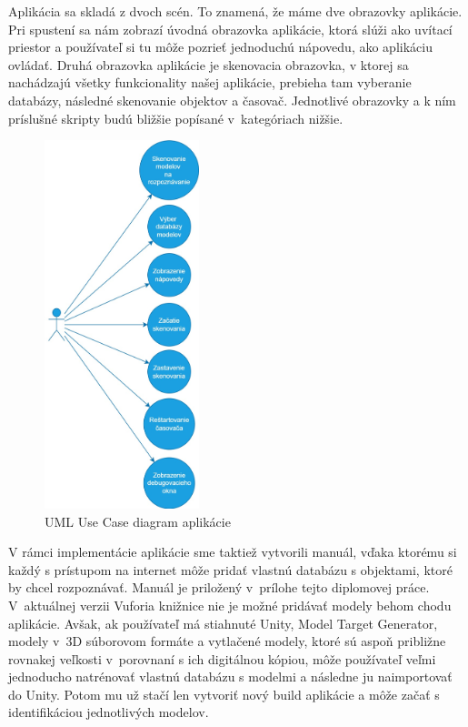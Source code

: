 Aplikácia sa skladá z dvoch scén. To znamená, že máme dve obrazovky aplikácie. Pri spustení sa nám zobrazí úvodná obrazovka aplikácie, ktorá slúži ako uvítací priestor a používateľ si tu môže pozrieť jednoduchú nápovedu, ako aplikáciu ovládať. Druhá obrazovka aplikácie je skenovacia obrazovka, v ktorej sa nachádzajú všetky funkcionality našej aplikácie, prebieha tam vyberanie databázy, následné skenovanie objektov a časovač. Jednotlivé obrazovky a k ním príslušné skripty budú bližšie popísané v~kategóriach nižšie. 

\begin{figure}[h]
\centering
\includegraphics[width=0.4\textwidth]{img/use_case_diagram.jpg}
\caption{UML Use Case diagram aplikácie}
\label{fig:useCaseDiagram}
\end{figure}

V rámci implementácie aplikácie sme taktiež vytvorili manuál, vďaka ktorému si každý s prístupom na internet môže pridať vlastnú databázu s objektami, ktoré by chcel rozpoznávať. Manuál je priložený v~prílohe tejto diplomovej práce. V~aktuálnej verzii Vuforia knižnice nie je možné pridávať modely behom chodu aplikácie. Avšak, ak používateľ má stiahnuté Unity, Model Target Generator, modely v~3D súborovom formáte a vytlačené modely, ktoré sú aspoň približne rovnakej veľkosti v~porovnaní s ich digitálnou kópiou, môže používateľ veľmi jednoducho natrénovať vlastnú databázu s modelmi a následne ju naimportovať do Unity. Potom mu už stačí len vytvoriť nový build aplikácie a môže začať s identifikáciou jednotlivých modelov. 

